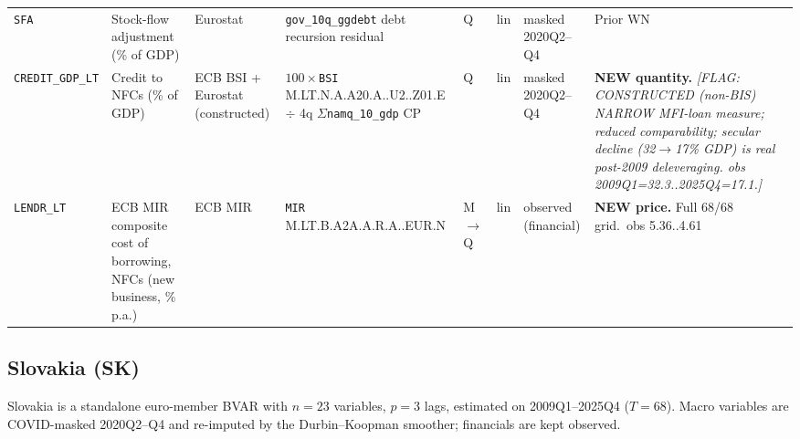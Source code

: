 {\begin{longtable}{@{}p{1.9cm}p{2.9cm}p{1.5cm}p{2.7cm}p{0.7cm}p{1.0cm}p{1.6cm}p{2.4cm}@{}}
\texttt{SFA}          & Stock-flow adjustment (\% of GDP) & Eurostat & \texttt{gov\_10q\_ggdebt} debt recursion residual      & Q & lin & masked 2020Q2--Q4 & Prior WN \\
\texttt{CREDIT\_GDP\_LT} & Credit to NFCs (\% of GDP)     & ECB BSI + Eurostat (constructed) & $100\times$\texttt{BSI} M.\allowbreak LT.\allowbreak N.\allowbreak A.\allowbreak A20.\allowbreak A.\allowbreak 1.\allowbreak U2.\allowbreak 2240.\allowbreak Z01.\allowbreak E $\div$ 4q $\Sigma$\texttt{namq\_10\_gdp} CP & Q & lin & masked 2020Q2--Q4 & \textbf{NEW quantity.} \textit{[FLAG: CONSTRUCTED (non-BIS) NARROW MFI-loan measure; reduced comparability; secular decline (32\(\to\)17\% GDP) is real post-2009 deleveraging. obs 2009Q1=32.3..2025Q4=17.1.]} \\
\texttt{LENDR\_LT}    & ECB MIR composite cost of borrowing, NFCs (new business, \% p.a.) & ECB MIR & \texttt{MIR} M.\allowbreak LT.\allowbreak B.\allowbreak A2A.\allowbreak A.\allowbreak R.\allowbreak A.\allowbreak 2240.\allowbreak EUR.\allowbreak N & M$\to$Q & lin & observed (financial) & \textbf{NEW price.} Full 68/68 grid.\ obs 5.36..4.61 \\
\end{longtable}}

\subsection{Slovakia (SK)}\label{sec:data:SK}
Slovakia is a standalone euro-member BVAR with $n=23$ variables,
$p=3$ lags, estimated on 2009Q1--2025Q4 ($T=68$).  Macro variables are
COVID-masked 2020Q2--Q4 and re-imputed by the Durbin--Koopman smoother;
financials are kept observed.

